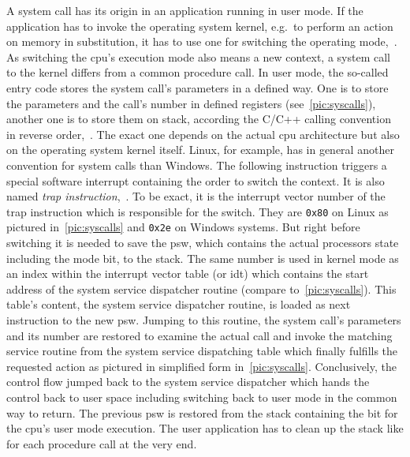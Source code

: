 A system call has its origin in an application running in user mode.
If the application has to invoke the operating system kernel, e.g.\ to perform an action on memory in substitution, it has to use one for switching the operating mode\cite{glatz2015betriebssysteme},~\cite{tanenbaum-modern-operating-systems}.
As switching the \ac{cpu}'s execution mode also means a new context, a system call to the kernel differs from a common procedure call.
In user mode, the so-called entry code stores the system call's parameters in a defined way.
One is to store the parameters and the call's number in defined registers (see~\ref{pic:syscalls}), another one is to store them on stack, according the C/C++ calling convention in reverse order\cite{silberschatz2009operating},~\cite{glatz2015betriebssysteme}.
The exact one depends on the actual \ac{cpu} architecture but also on the operating system kernel itself.
Linux, for example, has in general another convention for system calls than Windows. 
The following instruction triggers a special software interrupt containing the order to switch the context.
It is also named \textit{trap instruction}\cite{glatz2015betriebssysteme},~\cite{tanenbaum-modern-operating-systems}.
To be exact, it is the interrupt vector number of the trap instruction which is responsible for the switch.
They are \texttt{0x80} on Linux as pictured in~\ref{pic:syscalls} and \texttt{0x2e} on Windows systems\cite{glatz2015betriebssysteme}.
But right before switching it is needed to save the \acf{psw}, which contains the actual processors state including the mode bit, to the stack.
The same number is used in kernel mode as an index within the interrupt vector table (or \acf{idt}) which contains the start address of the system service dispatcher routine (compare to~\ref{pic:syscalls}).
This table's content, the system service dispatcher routine, is loaded as next instruction to the new \ac{psw}\cite{brause2017betriebssysteme}.
Jumping to this routine, the system call's parameters and its number are restored to examine the actual call and invoke the matching service routine from the system service dispatching table which finally fulfills the requested action as pictured in simplified form in~\ref{pic:syscalls}\cite{glatz2015betriebssysteme}.
Conclusively, the control flow jumped back to the system service dispatcher which hands the control back to user space including switching back to user mode in the common way to return\cite{glatz2015betriebssysteme}.
The previous \ac{psw} is restored from the stack containing the bit for the \ac{cpu}'s user mode execution.
The user application has to clean up the stack like for each procedure call at the very end\cite{tanenbaum-modern-operating-systems}.

